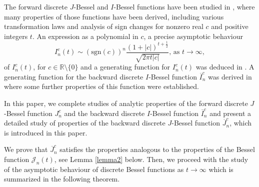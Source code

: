 \documentclass[12pt]{amsart}
\numberwithin{equation}{section}
\begin{document}
The forward discrete $J$-Bessel and $I$-Bessel functions have been studied in \cite{Slav18}, where many properties of those functions have been derived, including various transformation laws and analysis of sign changes for nonzero real $c$ and positive integers $t$.
An expression as a polynomial in $c$, a precise asymptotic behaviour
\begin{equation}\label{eq. I asympt as t to infty}
I_{n}^{c}\left( t\right) \sim \left( \mathrm{sgn}(c)\right) ^{n}%
\frac{\left( 1+\left\vert c\right\vert \right) ^{t+\frac{1}{2}}}{\sqrt{2\pi
t\left\vert c\right\vert }}\text{, as }t\rightarrow \infty,
\end{equation}
of $I_n^c(t)$, for $c\in\mathbb{R}\setminus\{0\}$ and a generating function for $I_n^c(t)$ was deduced in \cite[Section 3]{CHJSV}. A generating function for the backward discrete $I$-Bessel function $\overline{I}_{n}^{c}$ was derived in \cite{KS22} where some further properties of this function were established.

In this paper, we complete studies of analytic properties of the forward discrete $J$-Bessel function $J_n^c$ and the backward discrete $I$-Bessel function $\overline{I}_{n}^{c}$ and present a detailed study of properties of the backward discrete $J$-Bessel function $\overline{J}_{n}^{c}$, which is introduced in this paper.

We prove that $\overline{J}_{n}^{c}$ satisfies the properties analogous to the properties of the Bessel function $\mathcal{J}_n(t)$, see Lemma \ref{lemma2} below. Then, we proceed with the study of the
asymptotic behaviour of discrete Bessel functions as $t\to \infty$ which is summarized in the following theorem.
\end{document}
